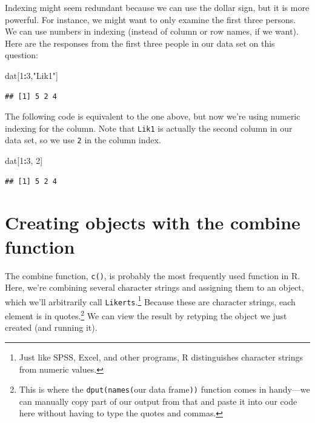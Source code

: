 \documentclass[
]{book}
\newenvironment{Shaded}{\begin{snugshade}}{\end{snugshade}}
\newcommand{\DecValTok}[1]{\textcolor[rgb]{0.00,0.00,0.81}{#1}}
\newcommand{\NormalTok}[1]{#1}
\newcommand{\OperatorTok}[1]{\textcolor[rgb]{0.81,0.36,0.00}{\textbf{#1}}}
\newcommand{\StringTok}[1]{\textcolor[rgb]{0.31,0.60,0.02}{#1}}
\begin{document}
Indexing might seem redundant because we can use the dollar sign, but it is more powerful. For instance, we might want to only examine the first three persons. We can use numbers in indexing (instead of column or row names, if we want). Here are the responses from the first three people in our data set on this question:

\begin{Shaded}
\begin{Highlighting}[]
\NormalTok{dat[}\DecValTok{1}\OperatorTok{:}\DecValTok{3}\NormalTok{,}\StringTok{"Lik1"}\NormalTok{]}
\end{Highlighting}
\end{Shaded}

\begin{verbatim}
## [1] 5 2 4
\end{verbatim}

The following code is equivalent to the one above, but now we're using numeric indexing for the column. Note that \texttt{Lik1} is actually the second column in our data set, so we use \texttt{2} in the column index.

\begin{Shaded}
\begin{Highlighting}[]
\NormalTok{dat[}\DecValTok{1}\OperatorTok{:}\DecValTok{3}\NormalTok{, }\DecValTok{2}\NormalTok{]}
\end{Highlighting}
\end{Shaded}

\begin{verbatim}
## [1] 5 2 4
\end{verbatim}

\hypertarget{creating-objects-with-the-combine-function}{%
\section{Creating objects with the combine function}\label{creating-objects-with-the-combine-function}}

The combine function, \texttt{c()}, is probably the most frequently used function in R. Here, we're combining several character strings and assigning them to an object, which we'll arbitrarily call \texttt{Likerts}.\footnote{Just like SPSS, Excel, and other programs, R distinguishes character strings from numeric values.} Because these are character strings, each element is in quotes.\footnote{This is where the \texttt{dput(names(}our data frame\texttt{))} function comes in handy---we can manually copy part of our output from that and paste it into our code here without having to type the quotes and commas.} We can view the result by retyping the object we just created (and running it).
\end{document}
